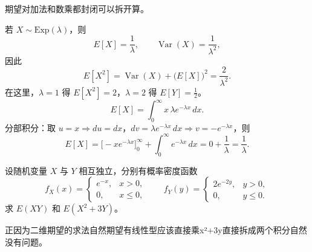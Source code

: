 \begin{dxtips}
    期望对加法和数乘都封闭可以拆开算。
\end{dxtips}
\begin{dxtips}
    若 $X\sim \mathrm{Exp}(\lambda)$，则
\[
E[X]=\frac{1}{\lambda},\qquad \operatorname{Var}(X)=\frac{1}{\lambda^2},
\]
因此
\[
E[X^2]=\operatorname{Var}(X)+\big(E[X]\big)^2=\frac{2}{\lambda^2}.
\]
在这里，$\lambda=1$ 得 $E[X^2]=2$，$\lambda=2$ 得 $E[Y]=\frac{1}{2}$。
\[
E[X]=\int_{0}^{\infty} x\,\lambda e^{-\lambda x}\,dx.
\]
分部积分：取 $u=x\Rightarrow du=dx$，$dv=\lambda e^{-\lambda x}\,dx\Rightarrow v=-e^{-\lambda x}$，则
\[
E[X]=\Big[-x e^{-\lambda x}\Big]_{0}^{\infty}
+\int_{0}^{\infty} e^{-\lambda x}\,dx
=0+\frac{1}{\lambda}
=\frac{1}{\lambda}.
\]
\end{dxtips}
\begin{homework}[3.21]
设随机变量 $X$ 与 $Y$ 相互独立，分别有概率密度函数
\[
f_X(x)=
\begin{cases}
e^{-x}, & x>0,\\
0, & x\le0,
\end{cases}
\qquad
f_Y(y)=
\begin{cases}
2e^{-2y}, & y>0,\\
0, & y\le0.
\end{cases}
\]
求 $E(XY)$ 和 $E(X^2+3Y)$。
\end{homework}
\begin{dxtips}
    正因为二维期望的求法自然期望有线性型应该直接乘x²+3y直接拆成两个积分自然没有问题。
\end{dxtips}
